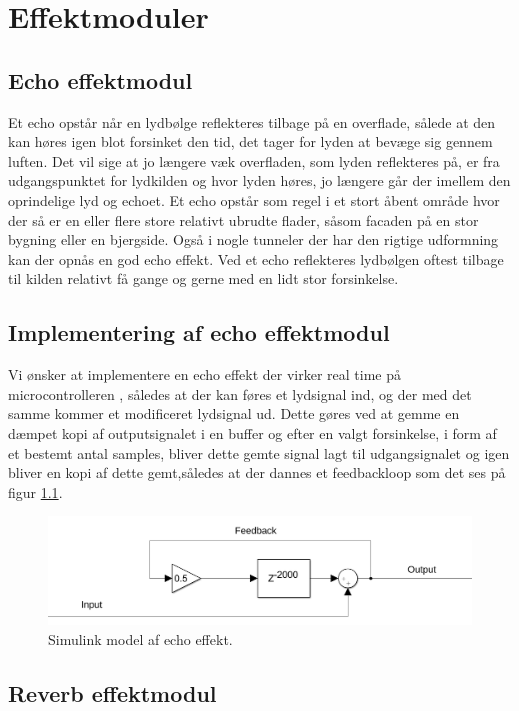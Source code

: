 \chapter{Effektmoduler}\label{chap:DSP}

\section{Echo effektmodul}\label{sec:echo}
Et echo opstår når en lydbølge reflekteres tilbage på en overflade, sålede at den kan høres igen blot forsinket den tid, det tager for lyden at bevæge sig gennem luften.
Det vil sige at jo længere væk overfladen, som lyden reflekteres på, er fra udgangspunktet for lydkilden og hvor lyden høres, jo længere går der imellem den oprindelige lyd og echoet.
Et echo opstår som regel i et stort åbent område hvor der så er en eller flere store relativt ubrudte flader, såsom facaden på en stor bygning eller en bjergside.
Også i nogle tunneler der har den rigtige udformning kan der opnås en god echo effekt.
Ved et echo reflekteres lydbølgen oftest tilbage til kilden relativt få gange og gerne med en lidt stor forsinkelse.

\section{Implementering af echo effektmodul}
Vi ønsker at implementere en echo effekt der virker real time på microcontrolleren , således at der kan føres et lydsignal ind, og der med det samme kommer et modificeret lydsignal ud.
Dette gøres ved at gemme en dæmpet kopi af outputsignalet i en buffer og efter en valgt forsinkelse, i form af et bestemt antal samples, bliver dette gemte signal lagt til udgangsignalet og igen bliver en kopi af dette gemt,således at der dannes et feedbackloop som det ses på figur \ref{fig:echo_simulink}.

\begin{figure}[h]
	\includegraphics[width=0.8\linewidth]{./billeder/Echo_simulink.png}
	\caption{Simulink model af echo effekt.}
	\label{fig:echo_simulink}
\end{figure}

\section{Reverb effektmodul}\label{sec:reverb}

